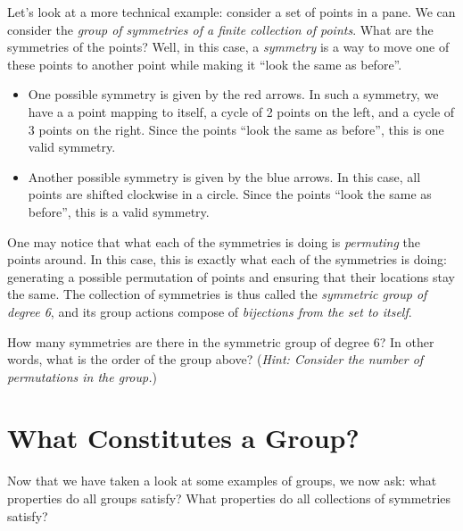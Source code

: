 \begin{figure}
    \centering
\end{figure}

\newpage

Let's look at a more technical example: consider a set of points in a pane. We can consider the \textit{group of symmetries of a finite collection of points}. What are the symmetries of the points? Well, in this case, a \textit{symmetry} is a way to move one of these points to another point while making it ``look the same as before''.

\begin{itemize}
    \item One possible symmetry is given by the red arrows. In such a symmetry, we have a a point mapping to itself, a cycle of 2 points on the left, and a cycle of 3 points on the right. Since the points ``look the same as before'', this is one valid symmetry.
    \item Another possible symmetry is given by the blue arrows. In this case, all points are shifted clockwise in a circle. Since the points ``look the same as before'', this is a valid symmetry.
\end{itemize}

One may notice that what each of the symmetries is doing is \textit{permuting} the points around. In this case, this is exactly what each of the symmetries is doing: generating a possible permutation of points and ensuring that their locations stay the same. The collection of symmetries is thus called the \textit{symmetric group of degree 6}, and its group actions compose of \textit{bijections from the set to itself}.

\begin{exercise}
    How many symmetries are there in the symmetric group of degree 6? In other words, what is the order of the group above?\newline
    (\textit{Hint: Consider the number of permutations in the group.})
\end{exercise}

\section{What Constitutes a Group?}
Now that we have taken a look at some examples of groups, we now ask: what properties do all groups satisfy? What properties do all collections of symmetries satisfy?

